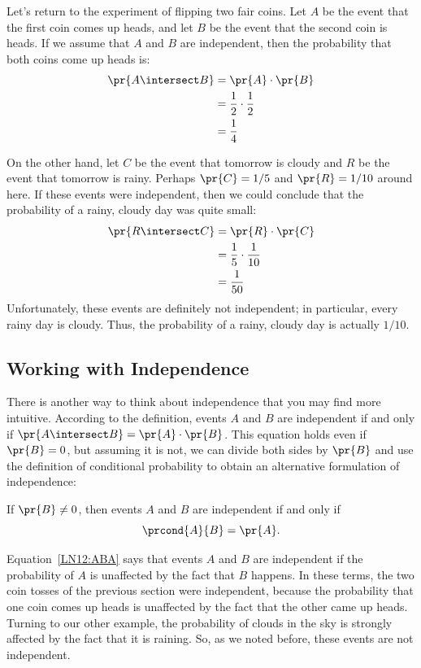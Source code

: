 Let's return to the experiment of flipping two fair coins.  Let $A$ be
the event that the first coin comes up heads, and let $B$ be the event
that the second coin is heads.  If we assume that $A$ and $B$ are
independent, then the probability that both coins come up heads is:
%
\begin{align*}
\pr{A \intersect B} & = \pr{A} \cdot \pr{B} \\
              & = \frac{1}{2} \cdot \frac{1}{2} \\
              & = \frac{1}{4}
\end{align*}

On the other hand, let $C$ be the event that tomorrow is cloudy and
$R$ be the event that tomorrow is rainy.  Perhaps $\pr{C} = 1/5$ and
$\pr{R} = 1/10$ around here.  If these events were independent, then
we could conclude that the probability of a rainy, cloudy day was
quite small:
%
\begin{align*}
\pr{R \intersect C} & = \pr{R} \cdot \pr{C} \\
              & = \frac{1}{5} \cdot \frac{1}{10} \\
              & = \frac{1}{50}
\end{align*}
%
Unfortunately, these events are definitely not independent; in
particular, every rainy day is cloudy.  Thus, the probability of a
rainy, cloudy day is actually $1/10$.

\subsection{Working with Independence}

There is another way to think about independence that you may find more
intuitive.  According to the definition, events $A$ and $B$ are
independent if and only if $\pr{A \intersect B} = \pr{A} \cdot \pr{B}$.  This
equation holds even if $\pr{B} = 0$, but assuming it is not, we can divide
both sides by $\pr{B}$ and use the definition of conditional probability
to obtain an alternative formulation of independence:
\begin{proposition*}
If $\pr{B} \neq 0$, then
events $A$ and $B$  are independent if and only if
\begin{equation}\label{LN12:ABA}
\prcond{A}{B} = \pr{A}.
\end{equation}
\end{proposition*}

Equation~\eqref{LN12:ABA} says that events $A$ and $B$ are independent if the
probability of $A$ is unaffected by the fact that $B$ happens.  In these
terms, the two coin tosses of the previous section were independent,
because the probability that one coin comes up heads is unaffected by the
fact that the other came up heads.  Turning to our other example, the
probability of clouds in the sky is strongly affected by the fact that it
is raining.  So, as we noted before, these events are not independent.

